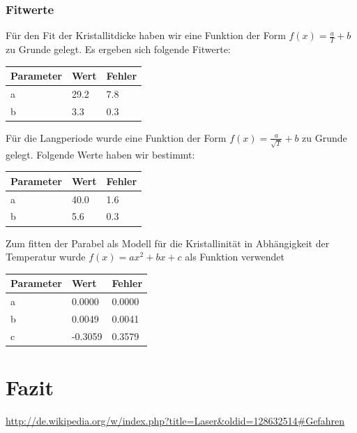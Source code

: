 \documentclass[bigchapter,colorback,accentcolor=tud4b,linedtoc,11pt]{tudreport}
\begin{document}
\clearpage{}
\subsection{Fitwerte}

Für den Fit der Kristallitdicke haben wir eine Funktion der Form $f\left(x\right) = \frac{a}{T} + b$ zu Grunde gelegt. Es ergeben sich folgende Fitwerte:
\begin{center}
  \begin{tabular}{|p{1.5cm}|p{1.5cm}|p{1.5cm}|}
    \hline
    Parameter & Wert    & Fehler \\ \hline
    a         & 29.2   & 7.8   \\ \hline
    b         & 3.3    & 0.3   \\ \hline
	\end{tabular}
\end{center}

Für die Langperiode wurde eine Funktion der Form $f\left(x\right)  = \frac{a}{\sqrt{T}} + b$ zu Grunde gelegt. Folgende Werte haben wir bestimmt:
\begin{center}
  \begin{tabular}{|p{1.5cm}|p{1.5cm}|p{1.5cm}|}
    \hline
    Parameter & Wert    & Fehler \\ \hline
    a         & 40.0   & 1.6   \\ \hline
    b         & 5.6    & 0.3   \\ \hline
	\end{tabular}
\end{center}

Zum fitten der Parabel als Modell für die Kristallinität in Abhängigkeit der Temperatur wurde $f\left(x\right)  = ax^2 + bx + c$ als Funktion verwendet

\begin{center}
  \begin{tabular}{|p{1.5cm}|p{1.5cm}|p{1.5cm}|}
    \hline
    Parameter & Wert    & Fehler \\ \hline
    a         & 0.0000  & 0.0000 \\ \hline
    b         & 0.0049  & 0.0041 \\ \hline
    c         & -0.3059 & 0.3579 \\ \hline
	\end{tabular}
\end{center}

\chapter{Fazit}

\cleardoublepage{}
\newpage
\begin{thebibliography}{100}
   \url{http://de.wikipedia.org/w/index.php?title=Laser&oldid=128632514#Gefahren}
\end{thebibliography}
\end{document}
